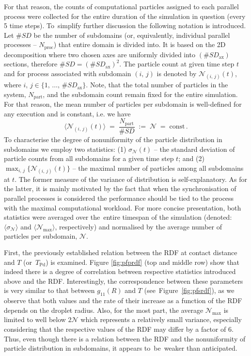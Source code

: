 \documentclass{pracamgren}
\begin{document}
For that reason, the counts of computational particles assigned to each parallel process were collected for the entire duration of the simulation in question (every 5 time steps).
To~simplify further discussion the following notation is introduced.
Let $\#SD$ be the number of subdomains (or, equivalently, individual parallel processes -- $N_{\text{proc}}$) that entire domain is divided into.
It is based on the 2D decomposition where two chosen axes are uniformly divided into $(\#SD_{\text{ax}})$ sections, therefore $\#SD = \left( \#SD_{\text{ax}} \right)^2$.
The particle count at given time step $t$ and for process associated with subdomain $(i,\,j)$ is denoted by $\mathcal{N}_{(i,\,j)}(t)$, where $i,\,j \in \{ 1, \, \ldots , \, \#SD_{\text{ax}} \}$.
Note, that the total number of particles in the system, $N_{\text{part}}$, and the subdomain count remain fixed for the entire simulation.
For that reason, the mean number of particles per subdomain is well-defined for any execution and is constant, i.e. we have
\begin{equation}
\langle \mathcal{N}_{(i,\,j)}(t) \rangle \; = \; \frac{N_{\text{part}}}{\#SD} \; := \; \mathcal{N} \; = \; \text{const} \, .
\label{eqn:pfp-avg}
\end{equation}
To characterise the degree of nonuniformity of the particle distribution in subdomains we employ two statistics: (1) $\sigma_{\mathcal{N}}(t)$ -- the standard deviation of particle counts from all subdomains for a given time step $t$; and (2) $\max_{i,\,j}\{\mathcal{N}_{(i,\,j)}(t)\}$ -- the maximal number of particles among all subdomains at $t$.
The former measure of the variance of distribution is self-explanatory.
As for the latter, it is mainly motivated by the fact that when the synchronisation of parallel processes is considered the performance should be tied to the process with the maximal computational workload.
For more concise presentation, both statistics were averaged over the~entire timespan of the simulation (denoted: $\langle \sigma_{\mathcal{N}} \rangle$ and $\langle \mathcal{N}_{\max} \rangle$, respectively) and normalised by the average number of particles per subdomain, $\mathcal{N}$.

\medskip

First, the previously established relation between the RDF at contact distance and $T$ (or~$T_{\text{Pd}}$) is examined.
Figure \ref{fig:pfprdf} (top and middle row) show that indeed there is a degree of correlation between respective statistics introduced above and the RDF.
Interestingly, the correspondence between these parameters is very similar to that between   $g_{11}(R)$ and $T$ (see~Figure~\ref{fig:pfsrdf}), as we observe that both values and the rate of their increase as a function of the RDF depends on the droplet radius.
Also, for the most part, the average $\mathcal{N}_{\text{max}}$ is limited to well below $2 \mathcal{N}$ which represents a relatively small variance, especially considering that the respective values of the RDF may differ by a factor of $6$.
Thus, even though there is a relation between the RDF and the nonuniformity of particle distribution in subdomains, it appears to~be~weaker than anticipated.
\end{document}
